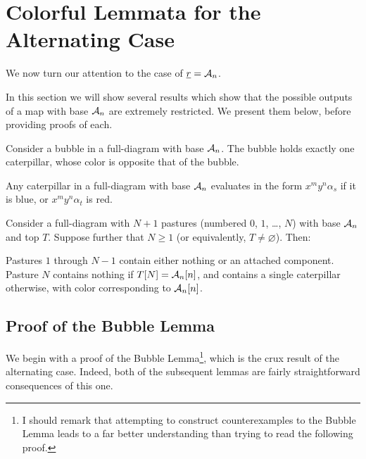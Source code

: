 \section{Colorful Lemmata for the Alternating Case}
\label{sec:res_alt_restrict}
We now turn our attention to the case of $\ul r = \AA_n$.

In this section we will show several results which show that the possible outputs of a map with base $\AA_n$ are extremely restricted.  We present them below, before providing proofs of each.
\begin{lemma}
	Consider a bubble in a full-diagram with base $\AA_n$.  The bubble holds exactly one caterpillar, whose color is opposite that of the bubble.
	\label{thm:bubble}
\end{lemma}
\begin{lemma}
	Any caterpillar in a full-diagram with base $\AA_n$ evaluates in the form $x^my^n\alpha_s$ if it is blue, or $x^my^n\alpha_t$ is red.
	\label{thm:caterpillar}
\end{lemma}
\begin{lemma}
	Consider a full-diagram with $N+1$ pastures (numbered $0$, $1$, \dots, $N$) with base $\AA_n$ and top $T$.  Suppose further that $N \ge 1$ (or equivalently, $T \neq \varnothing$).  Then:
	\begin{enumerate}[(i)]
		\ii Pastures $1$ through $N-1$ contain either nothing or an attached component.
		\ii Pasture $N$ contains nothing if $T[N] = \AA_n[n]$, and contains a single caterpillar otherwise, with color corresponding to $\AA_n[n]$.
	\end{enumerate}
	\label{thm:pasture}
\end{lemma}

\subsection{Proof of the Bubble Lemma}
We begin with a proof of the Bubble Lemma\footnote{I should remark that attempting to construct counterexamples to the Bubble Lemma leads to a far better understanding than trying to read the following proof.}, which is the crux result of the alternating case.  Indeed, both of the subsequent lemmas are fairly straightforward consequences of this one.  

